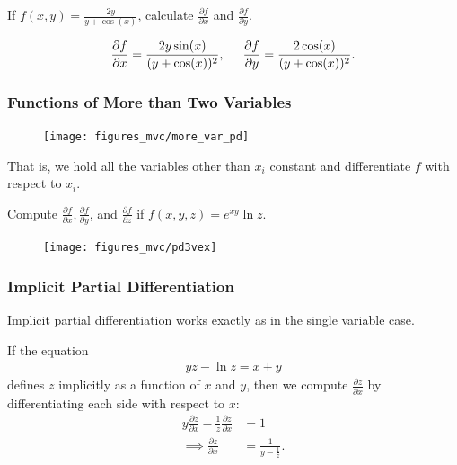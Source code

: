 \documentclass[12pt,letterpaper,reqno]{article}
\numberwithin{equation}{section}
\begin{document}
{ \begin{exercise}
If $f(x,y)=\frac{2y}{y+\cos(x)}$, calculate $\frac{\partial f}{\partial x}$ and $\frac{\partial f}{\partial y}$.	
\end{exercise}

{\color{red}\begin{solution}
	\begin{align*}
		\frac{\partial f}{\partial x}=\frac{2y\sin(x)}{(y+\cos(x))^2}, \hspace{0.5cm}
	\frac{\partial f}{\partial y}=\frac{2\cos(x)}{(y+\cos(x))^2}.
	\end{align*}	
\end{solution}}


\subsubsection{Functions of More than Two Variables}
\begin{figure}[h]
	\begin{center}
		\texttt{[image: figures\_mvc/more\_var\_pd]}
	\end{center}
\end{figure}
That is, we hold all the variables other than $x_i$ constant and differentiate $f$ with respect to $x_i$.

\begin{exercise}
Compute $\frac{\partial f}{\partial x}, \frac{\partial f}{\partial y}$, and  $\frac{\partial f}{\partial z}$ if $f(x,y,z)=e^{xy}\ln z$. 	
\end{exercise}

\begin{figure}[h]
	\begin{center}
		\texttt{[image: figures\_mvc/pd3vex]}
	\end{center}
\end{figure}

\subsubsection{Implicit Partial Differentiation}
Implicit partial differentiation works exactly as in the single variable case.

\begin{example}
If the equation
\begin{align*}
	yz-\ln z=x+y
\end{align*}	
defines $z$ implicitly as a function of $x$ and $y$, then we compute $\frac{\partial z}{\partial x}$ by differentiating each side with respect to $x$:
\begin{align*}
	y\frac{\partial z}{\partial x}-\frac{1}{z}\frac{\partial z}{\partial x}&=1 \\
	\implies \frac{\partial z}{\partial x}&=\frac{1}{y-\frac{1}{z}}.
\end{align*}
\end{example}

}
\end{document}
